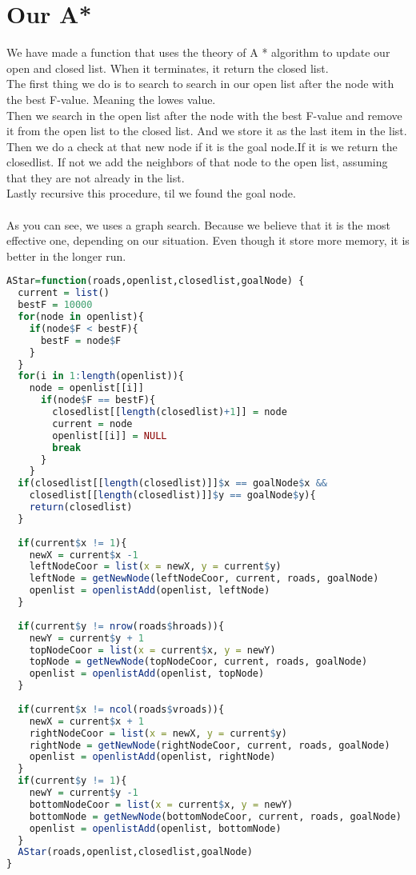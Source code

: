 \documentclass[12pt, a4paper]{article}
\begin{document}
\section{Our A*}
We have made a function that uses the theory of A * algorithm to update our open and closed list. When it terminates, it return the closed list.\\
The first thing we do is to search to search in our open list after the node with the best F-value. Meaning the lowes value.\\
Then we search in the open list after the node with the best F-value and remove it from the open list to the closed list. And we store it as the last item in the list.\\
Then we do a check at that new node if it is the goal node.If it is we return the closedlist. If not we add the neighbors of that node to the open list, assuming that they are not already in the list.\\
Lastly recursive this procedure, til we found the goal node.\\\\

As you can see, we uses a graph search. Because we believe that it is the most effective one, depending on our situation. Even though it store more memory, it is better in the longer run.

\begin{lstlisting}[language=R]
AStar=function(roads,openlist,closedlist,goalNode) {
  current = list()
  bestF = 10000
  for(node in openlist){
    if(node$F < bestF){
      bestF = node$F
    } 
  }
  for(i in 1:length(openlist)){
    node = openlist[[i]]
      if(node$F == bestF){
        closedlist[[length(closedlist)+1]] = node
        current = node
        openlist[[i]] = NULL
        break
      } 
    }
  if(closedlist[[length(closedlist)]]$x == goalNode$x && 
    closedlist[[length(closedlist)]]$y == goalNode$y){
    return(closedlist) 
  }
  
  if(current$x != 1){
    newX = current$x -1
    leftNodeCoor = list(x = newX, y = current$y)
    leftNode = getNewNode(leftNodeCoor, current, roads, goalNode)
    openlist = openlistAdd(openlist, leftNode)
  } 
  
  if(current$y != nrow(roads$hroads)){
    newY = current$y + 1
    topNodeCoor = list(x = current$x, y = newY)
    topNode = getNewNode(topNodeCoor, current, roads, goalNode)
    openlist = openlistAdd(openlist, topNode)
  } 
  
  if(current$x != ncol(roads$vroads)){
    newX = current$x + 1
    rightNodeCoor = list(x = newX, y = current$y)
    rightNode = getNewNode(rightNodeCoor, current, roads, goalNode)
    openlist = openlistAdd(openlist, rightNode)
  } 
  if(current$y != 1){
    newY = current$y -1
    bottomNodeCoor = list(x = current$x, y = newY)
    bottomNode = getNewNode(bottomNodeCoor, current, roads, goalNode)
    openlist = openlistAdd(openlist, bottomNode)
  }  
  AStar(roads,openlist,closedlist,goalNode)
}

\end{lstlisting}
\end{document}
